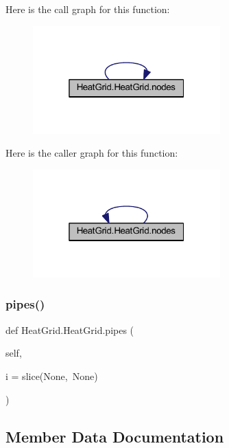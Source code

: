 Here is the call graph for this function\+:
\nopagebreak
\begin{figure}[H]
\begin{center}
\leavevmode
\includegraphics[width=205pt]{class_heat_grid_1_1_heat_grid_aee9b2652e4a04ae68e3e2c4779364dda_cgraph}
\end{center}
\end{figure}
Here is the caller graph for this function\+:
\nopagebreak
\begin{figure}[H]
\begin{center}
\leavevmode
\includegraphics[width=205pt]{class_heat_grid_1_1_heat_grid_aee9b2652e4a04ae68e3e2c4779364dda_icgraph}
\end{center}
\end{figure}
\mbox{\label{class_heat_grid_1_1_heat_grid_af17f7454a1291bba202b45f49f62a483}} 
\subsubsection{\texorpdfstring{pipes()}{pipes()}}
{\footnotesize\ttfamily def Heat\+Grid.\+Heat\+Grid.\+pipes (\begin{DoxyParamCaption}\item[{}]{self,  }\item[{}]{i = {\ttfamily slice(None,~None)} }\end{DoxyParamCaption})}



\subsection{Member Data Documentation}
\mbox{\label{class_heat_grid_1_1_heat_grid_a3611b66c8dfdfdd3e94db12e76cfe9b7}} 
